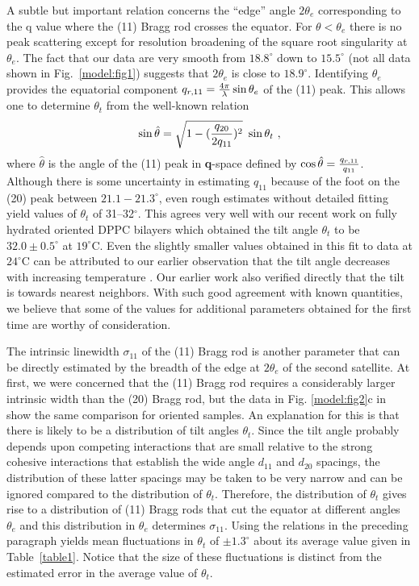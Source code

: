 A subtle but important relation concerns
the ``edge'' angle $2 {\theta}_{e}$ corresponding to the q
value where the (11) Bragg rod crosses the equator.  
For \( \theta < {\theta}_{e} \) there is no peak scattering except for resolution
broadening of the square root singularity at ${\theta}_{e}$.  The fact that
our data are very smooth from $18.8^{\circ}$ down to $15.5^{\circ}$ (not all data shown
in Fig.\ \ref{model:fig1}) suggests that $2 {\theta}_{e}$ is close to $18.9^{\circ}$.  
Identifying ${\theta}_{e}$ provides the equatorial component \(  q_{r,11} = {4 \pi 
\over \lambda} \sin {\theta}_{e} \) of the
(11) peak.  This allows one to determine ${\theta}_{t}$ from the
well-known relation \cite{LevTh,Smi88,HenHos83}
\begin{equation}
\label{et6}
\sin \hat{\theta} = \sqrt{1-({q_{20} \over 2 q_{11}})^2}~ \sin {\theta}_{t}~,
\end{equation}
where $\hat{\theta}$ is the angle of the (11) peak in {\bf q}-space
defined by \( \cos \hat{\theta} = {q_{r,11} \over q_{11}} \).
Although there is some uncertainty in estimating $q_{11}$ because of the foot
on the (20) peak between $21.1-21.3^{\circ}$,
even rough estimates without detailed fitting yield values
of ${\theta}_{t}$ of 31--32$^{\circ}$.  This agrees very well with our recent work 
\cite{STN92} on fully hydrated oriented DPPC bilayers which obtained the tilt angle
${\theta}_{t}$ to be $32.0 \pm 0.5^{\circ}$ at $19^{\circ}$C.  Even the slightly smaller
values obtained in this fit to data at $24^{\circ}$C can be attributed to our
earlier observation that the tilt angle decreases with increasing temperature
\cite{STN92}.
Our earlier work also verified directly that the tilt is towards nearest neighbors.  
With such good agreement with known quantities, we believe that some of the
values for additional parameters obtained for the first time are worthy of
consideration.  

The intrinsic linewidth ${\sigma}_{11}$ of the (11) Bragg rod is another parameter
that can be directly estimated by the breadth of the edge at $2 {\theta}_{e}$
of the second satellite.
At first, we were concerned that the (11) Bragg rod requires a 
considerably larger intrinsic width than the (20) Bragg rod, but
the data in Fig. \ref{model:fig2}c in \cite{Smi88} show the same comparison 
for oriented
samples.  An explanation
for this is that there is likely to be a distribution of tilt angles ${\theta}_{t}$.
Since the tilt angle probably depends upon competing interactions \cite{STN92} that
are small relative to the strong cohesive interactions that establish the
wide angle $d_{11}$ and $d_{20}$ spacings, the distribution
of these latter spacings may be taken to be very narrow and can be ignored
compared to the distribution of ${\theta}_{t}$.  Therefore, the
distribution of ${\theta}_{t}$ gives rise to a distribution of
(11) Bragg rods that cut the equator at different angles ${\theta}_{e}$ 
and this distribution in ${\theta}_{e}$ determines ${\sigma}_{11}$.  Using the 
relations in the preceding paragraph yields mean fluctuations in ${\theta}_{t}$
of  $\pm 1.3^{\circ}$ about its average value given in Table\ \ref{table1}.  Notice
that the size of these fluctuations is distinct from the estimated error
in the average value of ${\theta}_{t}$.

